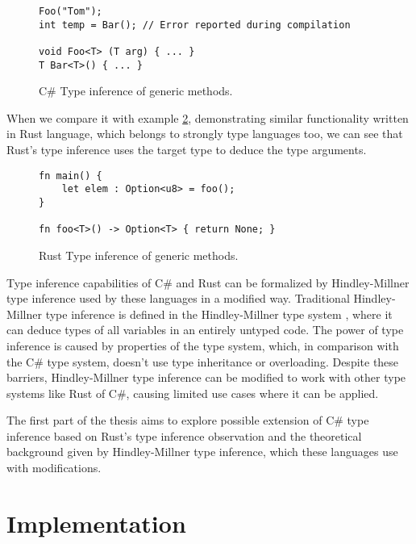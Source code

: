 \par
\begin{figure}
\begin{lstlisting}
Foo("Tom");
int temp = Bar(); // Error reported during compilation

void Foo<T> (T arg) { ... }
T Bar<T>() { ... }
\end{lstlisting}
\caption{C\# Type inference of generic methods.}
\label{img02:csharp_infer_meth}
\end{figure}
\par
When we compare it with example \ref{img03:rust_infer_meth}, demonstrating similar functionality written in Rust language, which belongs to strongly type languages too, we can see that Rust's type inference uses the target type to deduce the type arguments.
\par
\begin{figure}
\begin{lstlisting}
fn main() {
    let elem : Option<u8> = foo(); 
}

fn foo<T>() -> Option<T> { return None; }
\end{lstlisting}
\caption{Rust Type inference of generic methods.}
\label{img03:rust_infer_meth}
\end{figure}
\par
{}
Type inference capabilities of C\# and Rust can be formalized by Hindley-Millner type inference \cite{online:yHM} used by these languages in a modified way. 
Traditional Hindley-Millner type inference is defined in the Hindley-Millner type system \cite{online:wikiHM}, where it can deduce types of all variables in an entirely untyped code. 
The power of type inference is caused by properties of the type system, which, in comparison with the C\# type system, doesn't use type inheritance or overloading. 
Despite these barriers, Hindley-Millner type inference can be modified to work with other type systems like Rust of C\#, causing limited use cases where it can be applied.
\par
{}
The first part of the thesis aims to explore possible extension of C\# type inference based on Rust's type inference observation and the theoretical background given by Hindley-Millner type inference, which these languages use with modifications.

\section{Implementation}

